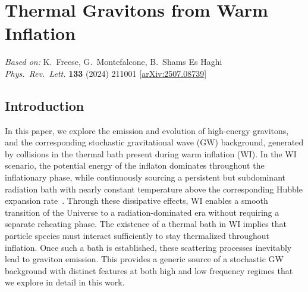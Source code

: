 \newcommand{\mpl}{M_{\rm pl}}

\chapter{Thermal Gravitons from Warm Inflation}
\label{ch:thermal-gravitons}

\begin{center}
\textit{Based on:} K.~Freese, G.~Montefalcone, B.~Shams Es Haghi\\
\textit{Phys.\ Rev.\ Lett.} \textbf{133} (2024) 211001
[\href{https://arxiv.org/abs/2507.08739}{arXiv:2507.08739}]
\end{center}
\vspace{1em}


\section{Introduction}

In this paper, we explore the emission and evolution of high-energy gravitons, and the corresponding stochastic gravitational wave (GW) background, generated by collisions in the thermal bath present during warm inflation (WI).
In the WI scenario, the potential energy of the inflaton dominates throughout the inflationary
phase, while continuously sourcing a persistent but subdominant radiation bath with nearly constant temperature above the corresponding Hubble expansion rate~\cite{Berera:1995ie,Berera:1995wh,Berera:1998px}. Through these dissipative effects, WI enables a smooth transition of the Universe to a radiation-dominated era without requiring a separate reheating phase. The existence of a thermal bath in WI implies that particle species must interact sufficiently to stay thermalized throughout inflation. Once such a bath is established,  these scattering processes inevitably lead to graviton emission. This provides a generic source of a stochastic GW background with distinct features at both high and low frequency regimes that we explore in detail in this work.

